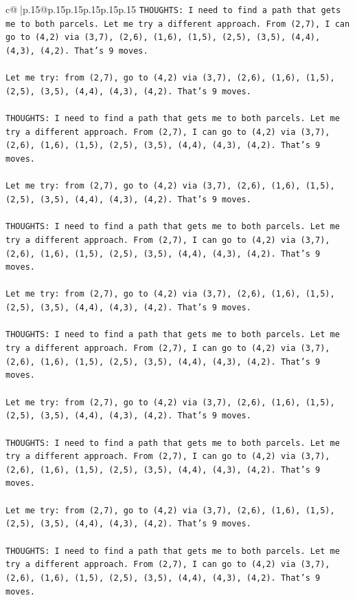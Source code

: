 \documentclass{article}
\begin{document}
{\begin{supertabular}{c@{$\;$}|p{.15\linewidth}@{}p{.15\linewidth}p{.15\linewidth}p{.15\linewidth}p{.15\linewidth}p{.15\linewidth}}
{{{\texttt{THOUGHTS: I need to find a path that gets me to both parcels. Let me try a different approach. From (2,7), I can go to (4,2) via (3,7), (2,6), (1,6), (1,5), (2,5), (3,5), (4,4), (4,3), (4,2). That's 9 moves.} \\
\\ 
\texttt{Let me try: from (2,7), go to (4,2) via (3,7), (2,6), (1,6), (1,5), (2,5), (3,5), (4,4), (4,3), (4,2). That's 9 moves.} \\
\\ 
\texttt{THOUGHTS: I need to find a path that gets me to both parcels. Let me try a different approach. From (2,7), I can go to (4,2) via (3,7), (2,6), (1,6), (1,5), (2,5), (3,5), (4,4), (4,3), (4,2). That's 9 moves.} \\
\\ 
\texttt{Let me try: from (2,7), go to (4,2) via (3,7), (2,6), (1,6), (1,5), (2,5), (3,5), (4,4), (4,3), (4,2). That's 9 moves.} \\
\\ 
\texttt{THOUGHTS: I need to find a path that gets me to both parcels. Let me try a different approach. From (2,7), I can go to (4,2) via (3,7), (2,6), (1,6), (1,5), (2,5), (3,5), (4,4), (4,3), (4,2). That's 9 moves.} \\
\\ 
\texttt{Let me try: from (2,7), go to (4,2) via (3,7), (2,6), (1,6), (1,5), (2,5), (3,5), (4,4), (4,3), (4,2). That's 9 moves.} \\
\\ 
\texttt{THOUGHTS: I need to find a path that gets me to both parcels. Let me try a different approach. From (2,7), I can go to (4,2) via (3,7), (2,6), (1,6), (1,5), (2,5), (3,5), (4,4), (4,3), (4,2). That's 9 moves.} \\
\\ 
\texttt{Let me try: from (2,7), go to (4,2) via (3,7), (2,6), (1,6), (1,5), (2,5), (3,5), (4,4), (4,3), (4,2). That's 9 moves.} \\
\\ 
\texttt{THOUGHTS: I need to find a path that gets me to both parcels. Let me try a different approach. From (2,7), I can go to (4,2) via (3,7), (2,6), (1,6), (1,5), (2,5), (3,5), (4,4), (4,3), (4,2). That's 9 moves.} \\
\\ 
\texttt{Let me try: from (2,7), go to (4,2) via (3,7), (2,6), (1,6), (1,5), (2,5), (3,5), (4,4), (4,3), (4,2). That's 9 moves.} \\
\\ 
\texttt{THOUGHTS: I need to find a path that gets me to both parcels. Let me try a different approach. From (2,7), I can go to (4,2) via (3,7), (2,6), (1,6), (1,5), (2,5), (3,5), (4,4), (4,3), (4,2). That's 9 moves.} \\
}}}
\end{supertabular}}
\end{document}
